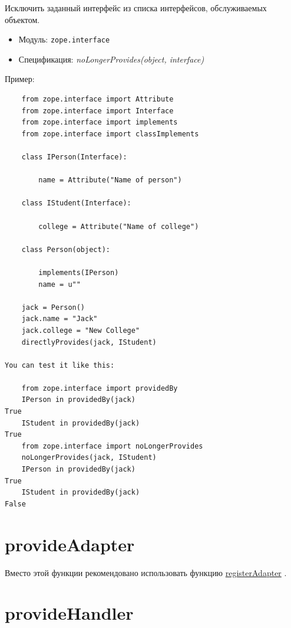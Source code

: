 \documentclass[a4paper,openany,twoside,final]{book}
\providecommand*{\DUroletitlereference}[1]{\textsl{#1}}
\begin{document}
Исключить заданный интерфейс из списка интерфейсов, обслуживаемых объектом.

\begin{itemize}

\item Модуль: \texttt{zope.interface}

\item Спецификация: \DUroletitlereference{noLongerProvides(object, interface)}

\end{itemize}

Пример:

\begin{verbatim}
    from zope.interface import Attribute
    from zope.interface import Interface
    from zope.interface import implements
    from zope.interface import classImplements

    class IPerson(Interface):

        name = Attribute("Name of person")

    class IStudent(Interface):

        college = Attribute("Name of college")

    class Person(object):

        implements(IPerson)
        name = u""

    jack = Person()
    jack.name = "Jack"
    jack.college = "New College"
    directlyProvides(jack, IStudent)

You can test it like this:

    from zope.interface import providedBy
    IPerson in providedBy(jack)
True
    IStudent in providedBy(jack)
True
    from zope.interface import noLongerProvides
    noLongerProvides(jack, IStudent)
    IPerson in providedBy(jack)
True
    IStudent in providedBy(jack)
False
\end{verbatim}


\section*{provideAdapter%
  \label{provideadapter}%
}

Вместо этой функции рекомендовано использовать функцию \hyperref[registeradapter]{registerAdapter} .


\section*{provideHandler%
  \label{providehandler}%
}
\end{document}
